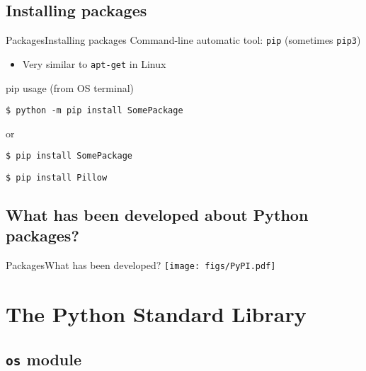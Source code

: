 \documentclass[10pt,compress]{beamer} %
\begin{document}
\subsection{Installing packages}
\begin{frame}[fragile]{Packages}{Installing packages}
	Command-line automatic tool: \texttt{pip} (sometimes \texttt{pip3})
		\begin{itemize}
			\item Very similar to \texttt{apt-get} in Linux
		\end{itemize}

	\begin{block}{pip usage (from OS terminal)}
	\vspace{-0.2cm}
	\begin{verbatim}
$ python -m pip install SomePackage
\end{verbatim}
or
	\begin{verbatim}
$ pip install SomePackage
\end{verbatim}
	\vspace{-0.2cm}
\end{block}

	\begin{exampleblock}{}
	\vspace{-0.2cm}
	\begin{verbatim}
$ pip install Pillow
\end{verbatim}
	\vspace{-0.2cm}
\end{exampleblock}
\end{frame}

\subsection{What has been developed about Python packages?}
\begin{frame}{Packages}{What has been developed?}
\centering \texttt{[image: figs/PyPI.pdf]}\\
\end{frame}


\section{The Python Standard Library}

\subsection{\texttt{os} module}
\end{document}

